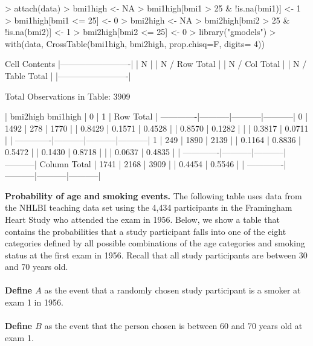 \documentclass{article}
\begin{document}
\begin{Schunk}
\begin{Sinput}
> attach(data)
> bmi1high <- NA
> bmi1high[bmi1 > 25 & !is.na(bmi1)] <- 1
> bmi1high[bmi1 <= 25] <- 0
> bmi2high <- NA
> bmi2high[bmi2 > 25 & !is.na(bmi2)] <- 1
> bmi2high[bmi2 <= 25] <- 0
> library("gmodels")
> with(data, CrossTable(bmi1high, bmi2high, prop.chisq=F, digits= 4))
\end{Sinput}
\begin{Soutput}
   Cell Contents
|-------------------------|
|                       N |
|           N / Row Total |
|           N / Col Total |
|         N / Table Total |
|-------------------------|

 
Total Observations in Table:  3909 

 
             | bmi2high 
    bmi1high |         0 |         1 | Row Total | 
-------------|-----------|-----------|-----------|
           0 |      1492 |       278 |      1770 | 
             |    0.8429 |    0.1571 |    0.4528 | 
             |    0.8570 |    0.1282 |           | 
             |    0.3817 |    0.0711 |           | 
-------------|-----------|-----------|-----------|
           1 |       249 |      1890 |      2139 | 
             |    0.1164 |    0.8836 |    0.5472 | 
             |    0.1430 |    0.8718 |           | 
             |    0.0637 |    0.4835 |           | 
-------------|-----------|-----------|-----------|
Column Total |      1741 |      2168 |      3909 | 
             |    0.4454 |    0.5546 |           | 
-------------|-----------|-----------|-----------|
\end{Soutput}
\end{Schunk}



\pagebreak
\textbf{Probability of age and smoking events.} The following table uses data from the NHLBI teaching data set using the 4,434 participants in the Framingham Heart Study who attended the exam in 1956. Below, we show a table that contains the probabilities that a study participant falls into one of the eight categories defined by all possible combinations of the age categories and smoking status at the first exam in 1956.  Recall that all study participants are between 30 and 70 years old.\\\\
\textbf{Define \(A\)} as the event that a randomly chosen study participant is a smoker at exam 1 in 1956.\\\\
\textbf{Define \(B\)} as the event that the person chosen is between 60 and 70 years old at exam 1.\\
\end{document}
